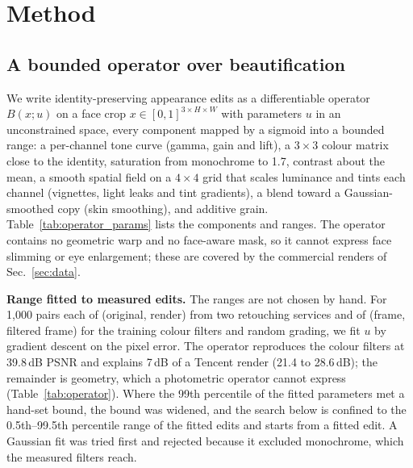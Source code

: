 \section{Method}
\label{sec:method}
\subsection{A bounded operator over beautification}
\label{sec:operator}
We write identity-preserving appearance edits as a differentiable operator $B(x;u)$ on a face crop $x\in[0,1]^{3\times H\times W}$
with parameters $u$ in an unconstrained space, every component mapped by a sigmoid into a bounded range:
a per-channel tone curve (gamma, gain and lift), a $3\times3$ colour matrix close to the identity, saturation from
monochrome to 1.7, contrast about the mean, a smooth spatial field on a $4\times4$ grid that scales luminance and tints each
channel (vignettes, light leaks and tint gradients), a blend toward a Gaussian-smoothed copy (skin smoothing), and additive
grain. Table~\ref{tab:operator_params} lists the components and ranges. The operator contains no geometric warp and no
face-aware mask, so it cannot express face slimming or eye enlargement; these are covered by the commercial renders of
Sec.~\ref{sec:data}.

\textbf{Range fitted to measured edits.} The ranges are not chosen by hand. For 1,000 pairs each of (original, render) from
two retouching services and of (frame, filtered frame) for the training colour filters and random grading, we fit $u$ by
gradient descent on the pixel error. The operator reproduces the colour filters at 39.8\,dB PSNR and explains 7\,dB of a
Tencent render (21.4 to 28.6\,dB); the remainder is geometry, which a photometric operator cannot express
(Table~\ref{tab:operator}). Where the 99th percentile of the fitted parameters met a hand-set bound, the bound was widened,
and the search below is confined to the 0.5th--99.5th percentile range of the fitted edits and starts from a fitted edit.
A Gaussian fit was tried first and rejected because it excluded monochrome, which the measured filters reach.

